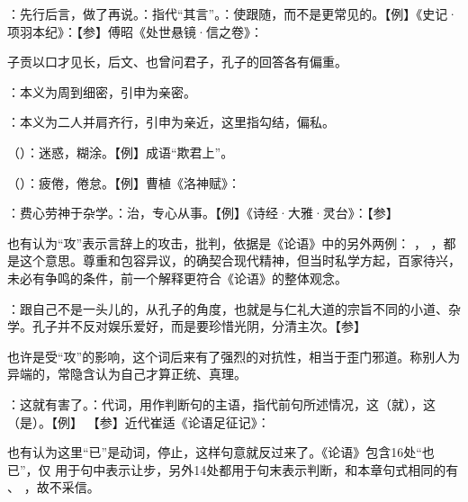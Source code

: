 {
\begin{lyitemize}
\item {}：先行后言，做了再说。：指代“其言”。：使跟随，而不是更常见的。【例】《史记·项羽本纪》：【参】傅昭《处世悬镜·信之卷》：
\end{lyitemize}
子贡以口才见长，后文、也曾问君子，孔子的回答各有偏重。
}
{} %


{
\item {}：本义为周到细密，引申为亲密。
\item {}：本义为二人并肩齐行，引申为亲近，这里指勾结，偏私。
}  %
{}


{
\item {}（）：迷惑，糊涂。【例】成语“欺君上”。
\item {}（）：疲倦，倦怠。【例】曹植《洛神赋》：
}
{}


{
\item {}：费心劳神于杂学。：治，专心从事。【例】《诗经·大雅·灵台》：【参】

也有认为“攻”表示言辞上的攻击，批判，依据是《论语》中的另外两例： ， ，都是这个意思。尊重和包容异议，的确契合现代精神，但当时私学方起，百家待兴，未必有争鸣的条件，前一个解释更符合《论语》的整体观念。

：跟自己不是一头儿的，从孔子的角度，也就是与仁礼大道的宗旨不同的小道、杂学。孔子并不反对娱乐爱好，而是要珍惜光阴，分清主次。【参】  

也许是受“攻”的影响，这个词后来有了强烈的对抗性，相当于歪门邪道。称别人为异端的，常隐含认为自己才算正统、真理。

\item {}：这就有害了。：代词，用作判断句的主语，指代前句所述情况，这（就），这（是）。【例】 【参】近代崔适《论语足征记》：

也有认为这里“已”是动词，停止，这样句意就反过来了。《论语》包含16处“也已”，仅  用于句中表示让步，另外14处都用于句末表示判断，和本章句式相同的有  、 ，故不采信。
}
{}


